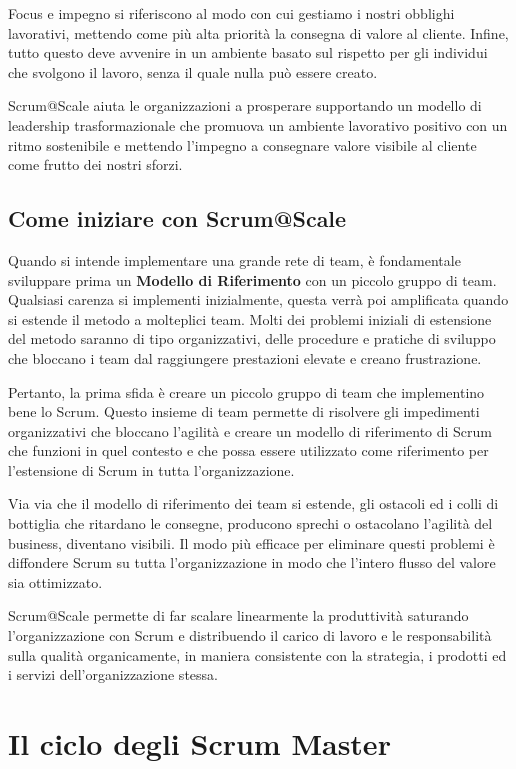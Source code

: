 \documentclass[12pt,a4paper,parskip=full]{scrartcl}
\begin{document}
Focus e impegno si riferiscono al modo con cui gestiamo i nostri obblighi lavorativi, mettendo come più alta priorità la consegna di valore al cliente. Infine, tutto questo deve avvenire in un ambiente basato sul rispetto per gli individui che svolgono il lavoro, senza il quale nulla può essere creato.

Scrum@Scale aiuta le organizzazioni a prosperare supportando un modello di leadership trasformazionale che promuova un ambiente lavorativo positivo con un ritmo sostenibile e mettendo l'impegno a consegnare valore visibile al cliente come frutto dei nostri sforzi.

\subsection{Come iniziare con Scrum@Scale}
Quando si intende implementare una grande rete di team, è fondamentale sviluppare prima un \textbf{Modello di Riferimento} con un piccolo gruppo di team. Qualsiasi carenza si implementi inizialmente, questa verrà poi amplificata quando si estende il metodo a molteplici team. Molti dei problemi iniziali di estensione del metodo saranno di tipo organizzativi, delle procedure e pratiche di sviluppo che bloccano i team dal raggiungere prestazioni elevate e creano frustrazione.

Pertanto, la prima sfida è creare un piccolo gruppo di team che implementino bene lo Scrum. Questo insieme di team permette di risolvere gli impedimenti organizzativi che bloccano l'agilità e creare un modello di riferimento di Scrum che funzioni in quel contesto e che possa essere utilizzato come riferimento per l'estensione di Scrum in tutta l'organizzazione.

Via via che il modello di riferimento dei team si estende, gli ostacoli ed i colli di bottiglia che ritardano le consegne, producono sprechi o ostacolano l'agilità del business,  diventano visibili. Il modo più efficace per eliminare questi problemi è diffondere Scrum su tutta l'organizzazione in modo che l'intero flusso del valore sia ottimizzato.

Scrum@Scale permette di far scalare linearmente la produttività saturando l'organizzazione con Scrum e distribuendo il carico di lavoro e le responsabilità sulla qualità organicamente, in maniera consistente con la strategia, i prodotti ed i servizi dell'organizzazione stessa.

\section{Il ciclo degli Scrum Master}
\end{document}

